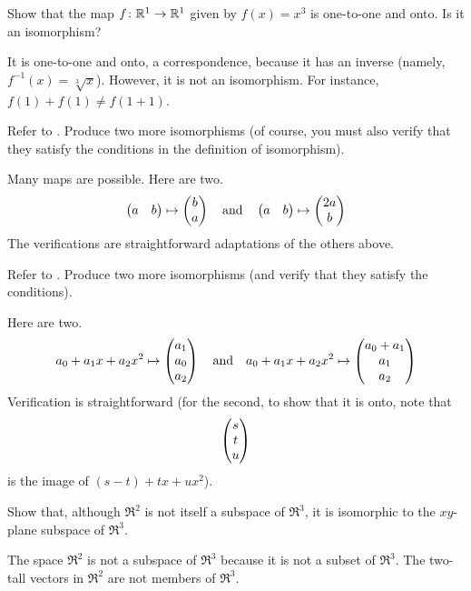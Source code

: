 \begin{exercises}
\begin{answer}
   \end{answer}
  \item 
    Show that the map \( \mbox{$f\colon \mathbb{R}^1\to \mathbb{R}^1$} \) 
    given by \( f(x)=x^3 \) is  one-to-one and onto.
    Is it an isomorphism?
    \begin{answer}
      It is one-to-one and onto, a correspondence,
      because it has an inverse (namely, \( f^{-1}(x)=\sqrt[3]{x} \)).
      However, it is not an isomorphism.
      For instance, \( f(1)+f(1)\neq f(1+1) \).     
    \end{answer}
  \recommended \item 
    Refer to .
    Produce two more isomorphisms 
    (of course, you must also verify that they satisfy the conditions in the 
    definition of isomorphism).
    \begin{answer}
     Many maps are possible.
     Here are two.
     \begin{equation*}
       \begin{pmatrix} a &b \end{pmatrix}\mapsto\begin{pmatrix} b \\ a \end{pmatrix}
       \quad\text{and}\quad
       \begin{pmatrix} a &b \end{pmatrix}\mapsto\begin{pmatrix} 2a \\ b \end{pmatrix}
     \end{equation*} 
     The verifications are straightforward adaptations of the others above.
    \end{answer}
  \item 
    Refer to .
    Produce two more isomorphisms
    (and verify that they satisfy the conditions).
    \begin{answer}
      Here are two.
      \begin{equation*}
        a_0+a_1x+a_2x^2 \mapsto \begin{pmatrix} a_1 \\ a_0 \\ a_2 \end{pmatrix}
        \quad\text{and}\quad
        a_0+a_1x+a_2x^2 \mapsto \begin{pmatrix} a_0+a_1 \\ a_1 \\ a_2 \end{pmatrix}
      \end{equation*}
      Verification is straightforward (for the second, to show that it is onto,
      note that 
      \begin{equation*}
        \begin{pmatrix} s \\ t \\ u \end{pmatrix}
      \end{equation*}
      is the image of $(s-t)+tx+ux^2$).
     \end{answer}
  \recommended \item 
     Show that, although \( \Re^2 \) is not itself a subspace of
     \( \Re^3 \),
     it is isomorphic to the \( xy \)-plane subspace of \( \Re^3 \).
     \begin{answer}
       The space $\Re^2$ is not a subspace of $\Re^3$ because it is not a 
       subset of $\Re^3$.
       The two-tall vectors in $\Re^2$ are not members of $\Re^3$.


\end{answer}
\end{exercises}
